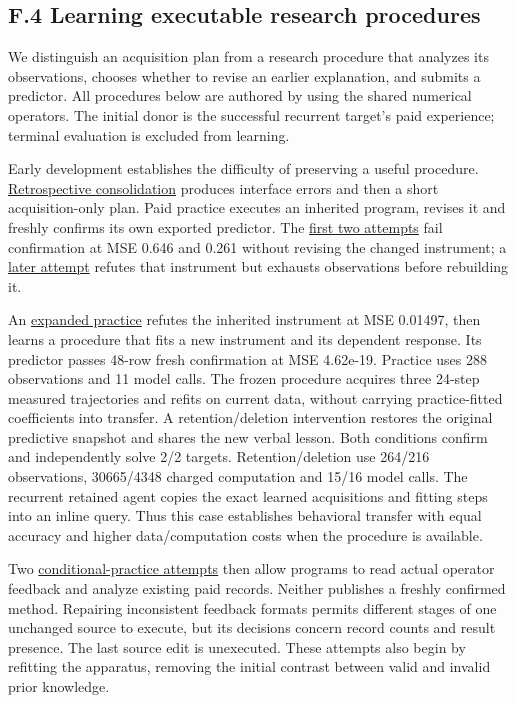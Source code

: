 \documentclass[11pt,a4paper]{article}
\begin{document}
\subsection*{F.4 Learning executable research procedures}

We distinguish an acquisition plan from a research procedure that analyzes its
observations, chooses whether to revise an earlier explanation, and submits a
predictor. All procedures below are authored by  using the shared
numerical operators. The initial donor is the successful recurrent target's paid
experience; terminal evaluation is excluded from learning.


Early development establishes the difficulty of preserving a useful procedure.
\hyperlink{artifact-58}{Retrospective consolidation}
produces interface errors and then a short acquisition-only plan. Paid practice
executes an inherited program, revises it and freshly confirms its own exported
predictor. The \hyperlink{artifact-59}{first two attempts}
fail confirmation at MSE 0.646 and 0.261 without revising the changed instrument;
a \hyperlink{artifact-60}{later attempt}
refutes that instrument but exhausts observations before rebuilding it.


An \hyperlink{artifact-61}{expanded practice}
refutes the inherited instrument at MSE 0.01497, then learns a procedure that fits
a new instrument and its dependent response. Its predictor passes 48-row fresh
confirmation at MSE 4.62e-19. Practice uses 288 observations and 11 model calls.
The frozen procedure acquires three 24-step measured trajectories and refits on
current data, without carrying practice-fitted coefficients into transfer. A
retention/deletion intervention restores the original predictive snapshot and
shares the new verbal lesson. Both conditions confirm and independently solve
2/2 targets. Retention/deletion use 264/216 observations, 30665/4348 charged
computation and 15/16 model calls. The recurrent retained agent copies the exact
learned acquisitions and fitting steps into an inline query. Thus this case
establishes behavioral transfer with equal accuracy and higher data/computation
costs when the procedure is available.


Two \hyperlink{artifact-62}{conditional-practice attempts}
then allow programs to read actual operator feedback and analyze existing paid
records. Neither publishes a freshly confirmed method. Repairing inconsistent
feedback formats permits different stages of one unchanged source to execute,
but its decisions concern record counts and result presence. The last source edit
is unexecuted. These attempts also begin by refitting the apparatus, removing the
initial contrast between valid and invalid prior knowledge.
\end{document}
